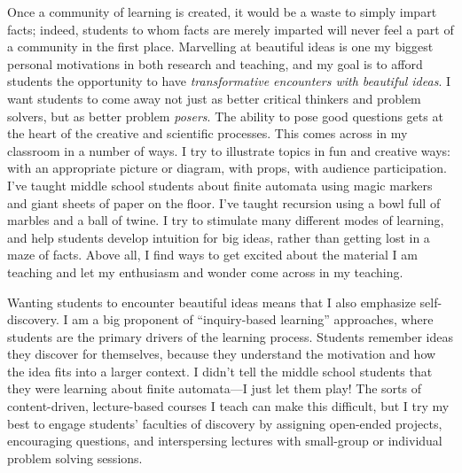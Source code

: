 \documentclass{article}
\begin{document}
Once a community of learning is created, it would be a waste to simply
impart facts; indeed, students to whom facts are merely imparted will
never feel a part of a community in the first place. Marvelling at
beautiful ideas is one my biggest personal motivations in both
research and teaching, and my goal is to afford students the
opportunity to have \emph{transformative encounters with beautiful
  ideas}.  I want students to come away not just as better critical
thinkers and problem solvers, but as better problem \emph{posers}.
The ability to pose good questions gets at the heart of the creative
and scientific processes. This comes across in my classroom in a
number of ways.  I try to illustrate topics in fun and creative ways:
with an appropriate picture or diagram, with props, with audience
participation.  I've taught middle school students about finite
automata using magic markers and giant sheets of paper on the floor.
I've taught recursion using a bowl full of marbles and a ball of
twine.  I try to stimulate many different modes of learning, and help
students develop intuition for big ideas, rather than getting lost in
a maze of facts.  Above all, I find ways to get excited about the
material I am teaching and let my enthusiasm and wonder come across in
my teaching.

Wanting students to encounter beautiful ideas means that I also
emphasize self-discovery. I am a big proponent of ``inquiry-based
learning'' approaches, where students are the primary drivers of the
learning process. Students remember ideas they discover for
themselves, because they understand the motivation and how the idea
fits into a larger context. I didn't tell the middle school students
that they were learning about finite automata---I just let them play!
The sorts of content-driven, lecture-based courses I teach can make
this difficult, but I try my best to engage students' faculties of
discovery by assigning open-ended projects, encouraging questions, and
interspersing lectures with small-group or individual problem solving
sessions.


\end{document}

